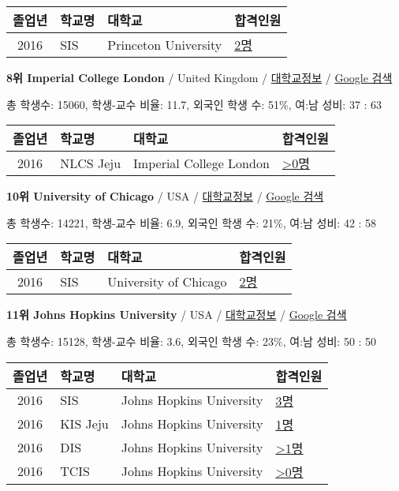 \documentclass[13pt,]{article}
\begin{document}
\begin{longtable}[]{@{}clll@{}}
\toprule
졸업년 & 학교명 & 대학교 & 합격인원\tabularnewline
\midrule
\endhead
2016 & SIS & Princeton University &
\href{http://cafe.naver.com/assarabia/11589}{2명}\tabularnewline
\bottomrule
\end{longtable}

\textbf{8위 Imperial College London} / United Kingdom /
\href{https://www.timeshighereducation.com/world-university-rankings/imperial-college-london?ranking-dataset=133819}{대학교정보}
/ \href{http://www.google.com/search?q=Imperial+College+London}{Google
검색}

총 학생수: 15060, 학생-교수 비율: 11.7, 외국인 학생 수: 51\%, 여:남
성비: 37 : 63

\begin{longtable}[]{@{}clll@{}}
\toprule
졸업년 & 학교명 & 대학교 & 합격인원\tabularnewline
\midrule
\endhead
2016 & NLCS Jeju & Imperial College London &
\href{http://cafe.naver.com/assarabia/11592}{\textgreater{}0명}\tabularnewline
\bottomrule
\end{longtable}

\textbf{10위 University of Chicago} / USA /
\href{https://www.timeshighereducation.com/world-university-rankings/university-of-chicago?ranking-dataset=133819}{대학교정보}
/ \href{http://www.google.com/search?q=University+of+Chicago}{Google
검색}

총 학생수: 14221, 학생-교수 비율: 6.9, 외국인 학생 수: 21\%, 여:남 성비:
42 : 58

\begin{longtable}[]{@{}clll@{}}
\toprule
졸업년 & 학교명 & 대학교 & 합격인원\tabularnewline
\midrule
\endhead
2016 & SIS & University of Chicago &
\href{http://cafe.naver.com/assarabia/11589}{2명}\tabularnewline
\bottomrule
\end{longtable}

\textbf{11위 Johns Hopkins University} / USA /
\href{https://www.timeshighereducation.com/world-university-rankings/johns-hopkins-university?ranking-dataset=133819}{대학교정보}
/ \href{http://www.google.com/search?q=Johns+Hopkins+University}{Google
검색}

총 학생수: 15128, 학생-교수 비율: 3.6, 외국인 학생 수: 23\%, 여:남 성비:
50 : 50

\begin{longtable}[]{@{}clll@{}}
\toprule
졸업년 & 학교명 & 대학교 & 합격인원\tabularnewline
\midrule
\endhead
2016 & SIS & Johns Hopkins University &
\href{http://cafe.naver.com/assarabia/11589}{3명}\tabularnewline
2016 & KIS Jeju & Johns Hopkins University &
\href{http://cafe.naver.com/assarabia/11596}{1명}\tabularnewline
2016 & DIS & Johns Hopkins University &
\href{http://cafe.naver.com/assarabia/11591}{\textgreater{}1명}\tabularnewline
2016 & TCIS & Johns Hopkins University &
\href{http://cafe.naver.com/assarabia/11598}{\textgreater{}0명}\tabularnewline
\bottomrule
\end{longtable}
\end{document}
